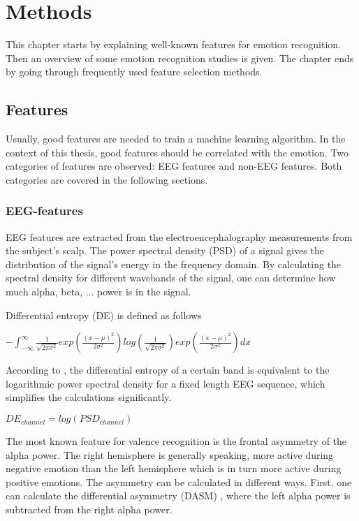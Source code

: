 \chapter{Methods}
{\samenvatting This chapter starts by explaining well-known features for emotion recognition. Then an overview of some emotion recognition studies is given. The chapter ends by going through frequently used feature selection methods.}

\section{Features}
\label{featuresExplained}
Usually, good features are needed to train a machine learning algorithm. In the context of this thesis, good features should be correlated with the emotion. Two categories of features are observed: EEG features and non-EEG features. Both categories are covered in the following sections.

\subsection{EEG-features}
EEG features are extracted from the electroencephalography measurements from the subject's scalp. The power spectral density (PSD)  of a signal gives the distribution of the signal's energy in the frequency domain. By calculating the spectral density for different wavebands of the signal, one can determine how much alpha, beta, ... power is in the signal.

\npar

Differential entropy (DE) is defined as follows \citep{killyPaper} \\
\begin{center}
$ - \int_{-\infty}^{\infty} \frac{1}{\sqrt{2\pi\sigma^2}} exp(\frac{(x-\mu)^2}{2\sigma^2}) log(\frac{1}{\sqrt{2\pi\sigma^2}}) exp(\frac{(x-\mu)^2}{2\sigma^2})dx$
\end{center}
According to \citep{diffEnt}, the differential entropy of a certain band is equivalent to the logarithmic power spectral density for a fixed length EEG sequence, which simplifies the calculations significantly.
\begin{center}
$DE_{channel} = log(PSD_{channel})$
\end{center}

\npar

The most known feature for valence recognition is the frontal asymmetry of the alpha power\cite{GivenPaper}. The right hemisphere is generally speaking, more active during negative emotion than the left hemisphere which is in turn more active during positive emotions\cite{RealTimeEEGEmotion,EEGDatasets,killyPaper}. The asymmetry can be calculated in different ways. First, one can calculate the differential asymmetry (DASM) , where the left alpha power is subtracted from the right alpha power.

